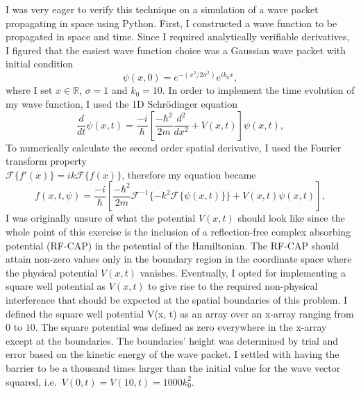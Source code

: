 \documentclass[10pt, a4paper, singlespacing]{report}
\begin{document}
I was very eager to verify this technique on a simulation of a wave packet propagating in space using Python. First, I constructed a wave function to be propagated in space and time. Since I required analytically verifiable derivatives, I figured that the easiest wave function choice was a Gaussian wave packet with initial condition 
\begin{equation} \label{eq:13}
\psi(x, 0) = e^{-(x^2/2\sigma^2)}e^{ik_{0}x},
\end{equation}
where I set $x \in \mathds{R}$, $\sigma = 1$ and $k_{0} = 10$. In order to implement the time evolution of my wave function, I used the 1D Schrödinger equation
 \begin{equation} \label{eq:14}
\frac{d}{dt}\psi(x, t) = \frac{-i}{\hbar} \left [ \frac{-\hbar^2}{2m} \frac{d^2}{dx^2} + V(x, t)\right ] \psi(x, t),
\end{equation}
To numerically calculate the second order spatial derivative, I used the Fourier transform property \\\mbox{$\mathcal{F}\{f'(x)\} = ik\mathcal{F}\{f(x)\}$}, therefore my equation became
\begin{equation} \label{eq:15}
f(x, t, \psi) = \frac{-i}{\hbar} \left [ \frac{-\hbar^2}{2m} \mathcal{F}^{-1}\{-k^2\mathcal{F}\{\psi(x, t)\}\} + V(x, t)\psi(x, t)\right ],
\end{equation}
I was originally unsure of what the potential $V(x,t)$ should look like since the whole point of this exercise is the inclusion of a reflection-free complex absorbing potential (RF-CAP) in the potential of the Hamiltonian. The RF-CAP should attain non-zero values only in the boundary region in the coordinate space where the physical potential $V(x,t)$ vanishes\cite{Moiseyev}. Eventually, I opted for implementing a square well potential as $V(x,t)$ to give rise to the required non-physical interference that should be expected at the spatial boundaries of this problem.
I defined the square well potential V(x, t) as an array over an x-array ranging from $0$ to $10$. The square potential was defined as zero everywhere in the x-array except at the boundaries. The boundaries' height was determined by trial and error based on the kinetic energy of the wave packet. I settled with having the barrier to be a thousand times larger than the initial value for the wave vector squared, \mbox{i.e. $V(0, t) = V(10, t) = 1000k_0^2$}.
\end{document}
